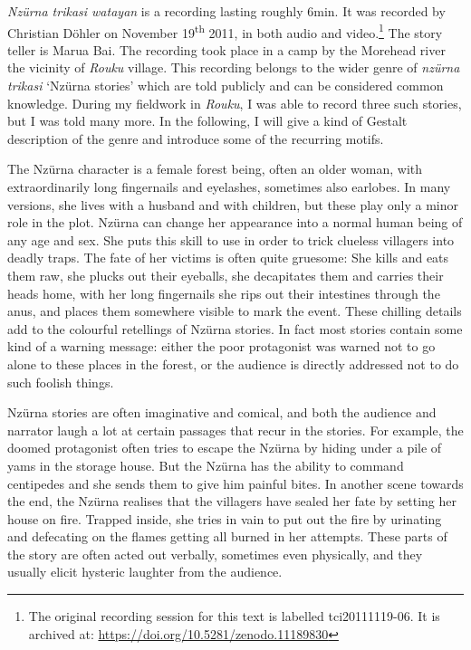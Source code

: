 \textit{Nzürna trikasi watayan} is a recording lasting roughly 6min. It was recorded by Christian Döhler on November 19\textsuperscript{th} 2011, in both audio and video.\footnote{The original recording session for this text is labelled tci20111119-06. It is archived at: \href{https://doi.org/10.5281/zenodo.11189830}{https://doi.org/10.5281/zenodo.11189830}} The story teller is Marua Bai. The recording took place in a camp by the Morehead river the vicinity of \textit{Rouku} village. This recording belongs to the wider genre of \textit{nzürna trikasi} `Nzürna stories' which are told publicly and can be considered common knowledge. During my fieldwork in \textit{Rouku}, I was able to record three such stories, but I was told many more. In the following, I will give a kind of Gestalt description of the genre and introduce some of the recurring motifs.

The Nzürna character is a female forest being, often an older woman, with extraordinarily long fingernails and eyelashes, sometimes also earlobes. In many versions, she lives with a husband and with children, but these play only a minor role in the plot. Nzürna can change her appearance into a normal human being of any age and sex. She puts this skill to use in order to trick clueless villagers into deadly traps. The fate of her victims is often quite gruesome: She kills and eats them raw, she plucks out their eyeballs, she decapitates them and carries their heads home, with her long fingernails she rips out their intestines through the anus, and places them somewhere visible to mark the event. These chilling details add to the colourful retellings of Nzürna stories. In fact most stories contain some kind of a warning message: either the poor protagonist was warned not to go alone to these places in the forest, or the audience is directly addressed not to do such foolish things.

Nzürna stories are often imaginative and comical, and both the audience and narrator laugh a lot at certain passages that recur in the stories. For example, the doomed protagonist often tries to escape the Nzürna by hiding under a pile of yams in the storage house. But the Nzürna has the ability to command centipedes and she sends them to give him painful bites. In another scene towards the end, the Nzürna realises that the villagers have sealed her fate by setting her house on fire. Trapped inside, she tries in vain to put out the fire by urinating and defecating on the flames getting all burned in her attempts. These parts of the story are often acted out verbally, sometimes even physically, and they usually elicit hysteric laughter from the audience.


